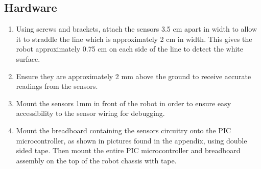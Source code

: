 \documentclass[12pt]{article}
\begin{document}
\subsection{Hardware}
\begin{enumerate}
	\item Using screws and brackets, attach the sensors 3.5 cm apart in width to allow it to straddle the line which is approximately 2 cm in width. This gives the robot approximately 0.75 cm on each side of the line to detect the white surface.
	\item Ensure they are approximately 2 mm above the ground to receive accurate readings from the sensors.
	\item Mount the sensors 1mm in front of the robot in order to ensure easy accessibility to the sensor wiring for debugging.
	\item Mount the breadboard containing the sensors circuitry onto the PIC microcontroller, as shown in pictures found in the appendix, using double sided tape. Then mount the entire PIC microcontroller and breadboard assembly on the top of the robot chassis with tape.
\end{enumerate}
\newpage
\end{document}
